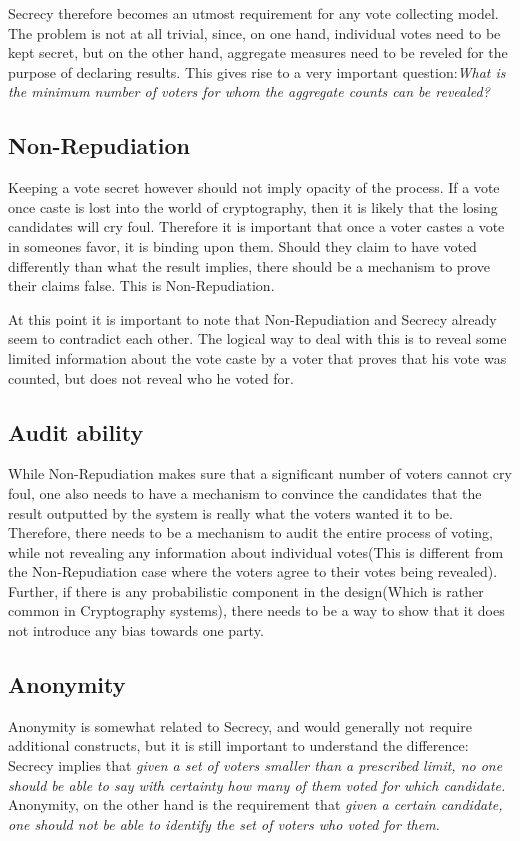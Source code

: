 \documentclass{article}
\begin{document}
Secrecy therefore becomes an utmost requirement for any vote collecting model. The problem is not at all trivial, since, on one hand, individual votes need to be kept secret, but on the other hand, aggregate measures need to be reveled for the purpose of declaring results. This gives rise to a very important question:\textit{What is the minimum number of voters for whom the aggregate counts can be revealed?} 
\subsection{Non-Repudiation}
Keeping a vote secret however should not imply opacity of the process. If a vote once caste is lost into the world of cryptography, then it is likely that the losing candidates will cry foul. Therefore it is important that once a voter castes a vote in someones favor, it is binding upon them. Should they claim to have voted differently than what the result implies, there should be a mechanism to prove their claims false. This is Non-Repudiation.\newline

At this point it is important to note that Non-Repudiation and Secrecy already seem to contradict each other. The logical way to deal with this is to reveal some limited information about the vote caste by a voter that proves that his vote was counted, but does not reveal who he voted for. 
\subsection{Audit ability}
While Non-Repudiation makes sure that a significant number of voters cannot cry foul, one also needs to have a mechanism to convince the candidates that the result outputted by the system is really what the voters wanted it to be. Therefore, there needs to be a mechanism to audit the entire process of voting, while not revealing any information about individual votes(This is different from the Non-Repudiation case where the voters agree to their votes being revealed). Further, if there is any probabilistic component in the design(Which is rather common in Cryptography systems), there needs to be a way to show that it does not introduce any bias towards one party.
\subsection{Anonymity}
Anonymity is somewhat related to Secrecy, and would generally not require additional constructs, but it is still important to understand the difference: Secrecy implies that \textit{given a set of voters smaller than a prescribed limit, no one should be able to say with certainty how many of them voted for which candidate.} Anonymity, on the other hand is the requirement that \textit{given a certain candidate, one should not be able to identify the set of voters who voted for them.}  
\end{document}
